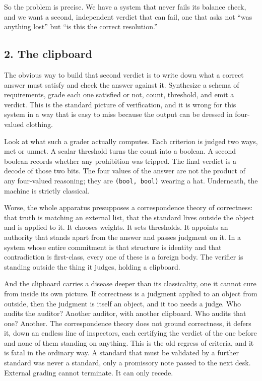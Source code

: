 \documentclass[12pt,a4paper]{article}
\begin{document}
So the problem is precise. We have a system that never fails its balance
check, and we want a second, independent verdict that can fail, one that
asks not ``was anything lost'' but ``is this the correct resolution.''

\hypertarget{the-clipboard}{%
\subsection{2. The clipboard}\label{the-clipboard}}

The obvious way to build that second verdict is to write down what a
correct answer must satisfy and check the answer against it. Synthesize
a schema of requirements, grade each one satisfied or not, count,
threshold, and emit a verdict. This is the standard picture of
verification, and it is wrong for this system in a way that is easy to
miss because the output can be dressed in four-valued clothing.

Look at what such a grader actually computes. Each criterion is judged
two ways, met or unmet. A scalar threshold turns the count into a
boolean. A second boolean records whether any prohibition was tripped.
The final verdict is a decode of those two bits. The four values of the
answer are not the product of any four-valued reasoning; they are
\texttt{(bool,\ bool)} wearing a hat. Underneath, the machine is
strictly classical.

Worse, the whole apparatus presupposes a correspondence theory of
correctness: that truth is matching an external list, that the standard
lives outside the object and is applied to it. It chooses weights. It
sets thresholds. It appoints an authority that stands apart from the
answer and passes judgment on it. In a system whose entire commitment is
that structure is identity and that contradiction is first-class, every
one of these is a foreign body. The verifier is standing outside the
thing it judges, holding a clipboard.

And the clipboard carries a disease deeper than its classicality, one it
cannot cure from inside its own picture. If correctness is a judgment
applied to an object from outside, then the judgment is itself an
object, and it too needs a judge. Who audits the auditor? Another
auditor, with another clipboard. Who audits that one? Another. The
correspondence theory does not ground correctness, it defers it, down an
endless line of inspectors, each certifying the verdict of the one
before and none of them standing on anything. This is the old regress of
criteria, and it is fatal in the ordinary way. A standard that must be
validated by a further standard was never a standard, only a promissory
note passed to the next desk. External grading cannot terminate. It can
only recede.
\end{document}
